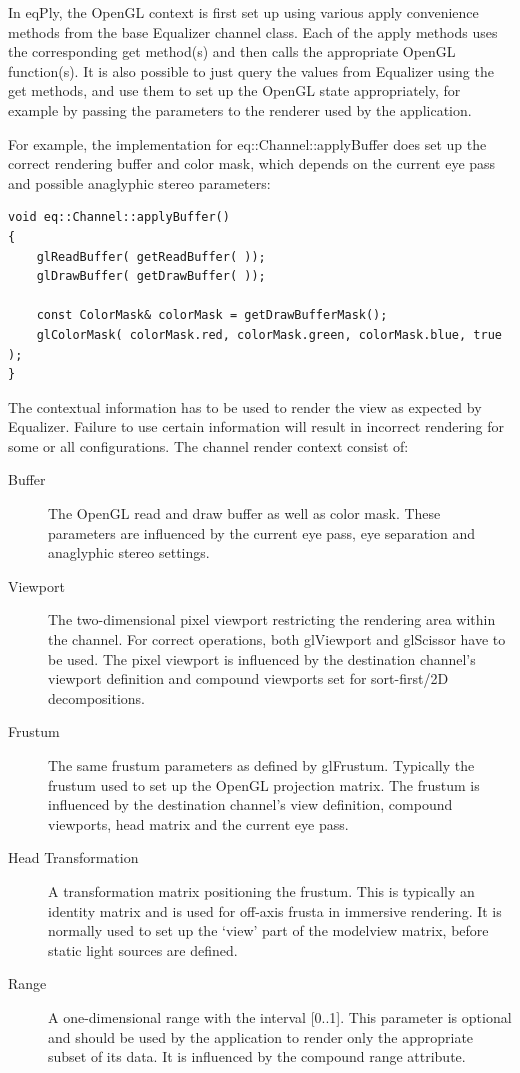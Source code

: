 \documentclass[10pt,a4]{scrartcl}
\begin{document}
In \textsf{eqPly}, the OpenGL context is first set up using various
\textsf{apply} convenience methods from the base Equalizer channel
class. Each of the \textsf{apply} methods uses the corresponding
\textsf{get} method(s) and then calls the appropriate OpenGL
function(s). It is also possible to just query the values from Equalizer
using the \textsf{get} methods, and use them to set up the OpenGL state
appropriately, for example by passing the parameters to the renderer used
by the application.

For example, the implementation for \textsf{eq::Channel::applyBuffer}
does set up the correct rendering buffer and color mask, which depends
on the current eye pass and possible anaglyphic stereo parameters:

{\footnotesize\begin{lstlisting}
void eq::Channel::applyBuffer()
{
    glReadBuffer( getReadBuffer( ));
    glDrawBuffer( getDrawBuffer( ));
    
    const ColorMask& colorMask = getDrawBufferMask();
    glColorMask( colorMask.red, colorMask.green, colorMask.blue, true );
}
\end{lstlisting}}

The contextual information has to be used to render the view as
expected by Equalizer. Failure to use certain information will result in
incorrect rendering for some or all configurations. The channel render
context consist of:

\begin{description}
\item[Buffer] The OpenGL read and draw buffer as well as color mask.
  These parameters are influenced by the current eye pass, eye
  separation and anaglyphic stereo settings.
\item[Viewport] The two-dimensional pixel viewport restricting the
  rendering area within the channel. For correct operations, both
  \textsf{glViewport} and \textsf{glScissor} have to be used. The pixel
  viewport is influenced by the destination channel's viewport
  definition and compound viewports set for sort-first/2D decompositions.
\item[Frustum] The same frustum parameters as defined by
  \textsf{glFrustum}. Typically the frustum used to set up the OpenGL
  projection matrix. The frustum is influenced by the destination
  channel's view definition, compound viewports, head matrix and the
  current eye pass.
\item[Head Transformation] A transformation matrix positioning the
  frustum. This is typically an identity matrix and is used for off-axis
  frusta in immersive rendering. It is normally used to set up the
  `view' part of the modelview matrix, before static light sources are
  defined.
\item[Range] A one-dimensional range with the interval [0..1]. This
  parameter is optional and should be used by the application to render
  only the appropriate subset of its data. It is influenced by the
  compound range attribute.
\end{description}
\end{document}
